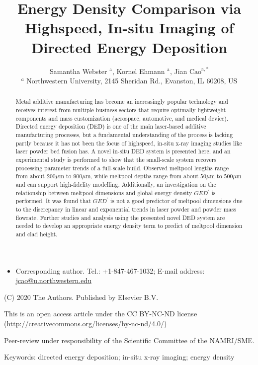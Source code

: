 \documentclass[10pt]{article}
\title{Energy Density Comparison via Highspeed, In-situ Imaging of Directed Energy Deposition }
\author{Samantha Webster ${ }^{\mathrm{a}}$, Kornel Ehmann ${ }^{\mathrm{a}}$, Jian $\mathrm{Cao}^{\mathrm{a}, *}$\\
${ }^{a}$ Northwestern University, 2145 Sheridan Rd., Evanston, IL 60208, US}
\date{}
\begin{document}
\maketitle


\begin{itemize}
  \item Corresponding author. Tel.: +1-847-467-1032; E-mail address: \href{mailto:jcao@u.northwestern.edu}{jcao@u.northwestern.edu}
\end{itemize}

\begin{abstract}
Metal additive manufacturing has become an increasingly popular technology and receives interest from multiple business sectors that require optimally lightweight components and mass customization (aerospace, automotive, and medical device). Directed energy deposition (DED) is one of the main laser-based additive manufacturing processes, but a fundamental understanding of the process is lacking partly because it has not been the focus of highspeed, in-situ x-ray imaging studies like laser powder bed fusion has. A novel in-situ DED system is presented here, and an experimental study is performed to show that the small-scale system recovers processing parameter trends of a full-scale build. Observed meltpool lengths range from about $200 \mu \mathrm{m}$ to $900 \mu \mathrm{m}$, while meltpool depths range from about $50 \mu \mathrm{m}$ to $500 \mu \mathrm{m}$ and can support high-fidelity modelling. Additionally, an investigation on the relationship between meltpool dimensions and global energy density $G E D^{\prime}$ is performed. It was found that $G E D^{\prime}$ is not a good predictor of meltpool dimensions due to the discrepancy in linear and exponential trends in laser powder and powder mass flowrate. Further studies and analysis using the presented novel DED system are needed to develop an appropriate energy density term to predict of meltpool dimension and clad height.
\end{abstract}

(C) 2020 The Authors. Published by Elsevier B.V.

This is an open access article under the CC BY-NC-ND license (\href{http://creativecommons.org/licenses/by-nc-nd/4.0/}{http://creativecommons.org/licenses/by-nc-nd/4.0/})

Peer-review under responsibility of the Scientific Committee of the NAMRI/SME.

Keywords: directed energy deposition; in-situ x-ray imaging; energy density
\end{document}
